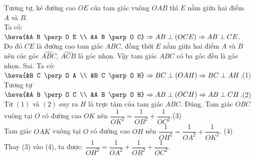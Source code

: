 \begin{ex}
{\begin{itemchoice}
   Tương tự, kẻ đường cao $O E$ của tam giác vuông $O  A B$ thì $E$ nằm giữa hai điểm $A$ và $B$.\\
   Ta có: $\heva{&A B \perp O E  \\ &A B \perp O C} \Rightarrow A B \perp(O C E) \Rightarrow A B \perp C E$.\\
   Do đó $C E$ là đường cao tam giác $A B C$, đồng thời $E$  nằm giữa hai điểm $A$ và $B$ nên các góc $\widehat{ABC}$, $\widehat{ACB}$ là góc nhọn.
   Vậy tam giác  $A B C$ có ba góc đều là góc nhọn.
   \itemch Sai. Ta có: $\heva{&B C \perp O A \\ &B C \perp O H} \Rightarrow B  C \perp(O A H) \Rightarrow B C \perp A H$.\hfill{(1)}\\
   Tương tự $\heva{&A B \perp O C \\ &A B \perp O H} \Rightarrow A B \perp(O C H) \Rightarrow A B  \perp C H$.\hfill{(2)}\\
   Từ $(1)$  và $(2)$ suy ra $H$ là trực tâm của tam giác $A B C$.
   \itemch Đúng. Tam giác $O B C$ vuông tại $O$ có đường cao $O K$  nên $\dfrac{1}{O K^2}=\dfrac{1}{O B^2}+\dfrac{1}{O C^2}$.\hfill{(3)}\\
   Tam giác $O A K$ vuông tại $O$ có đường cao $O H$ nên $\dfrac{1}{O H^2}=\dfrac{1}{O A^2}+\dfrac{1}{O K^2}$. \hfill{(4)}\\ Thay (3) vào (4), ta được: $\dfrac{1}{O H^2}=\dfrac{1}{O A^2}+\dfrac{1}{O B^2}+\dfrac{1}{O C^2}$. 
  \end{itemchoice}
  }
\end{ex}

